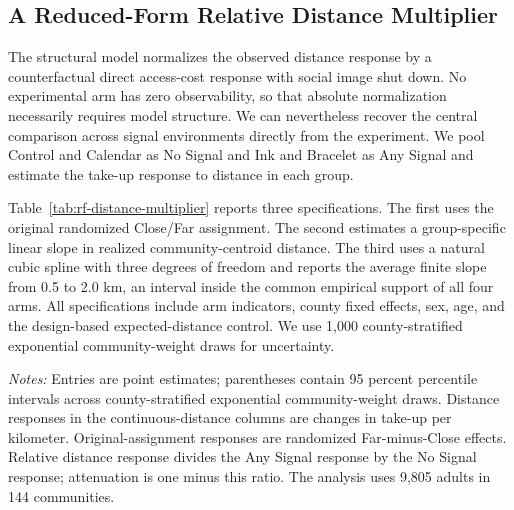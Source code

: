 \documentclass[12pt]{article}
\begin{document}
\providecommand{\StructuralRobustnessPath}{appendix/structural-robustness}

\subsection{A Reduced-Form Relative Distance Multiplier}
\label{app:reduced-form-distance-multiplier}

The structural model normalizes the observed distance response by a
counterfactual direct access-cost response with social image shut down. No
experimental arm has zero observability, so that absolute normalization
necessarily requires model structure. We can nevertheless recover the central
comparison across signal environments directly from the experiment. We pool
Control and Calendar as No Signal and Ink and Bracelet as Any Signal and
estimate the take-up response to distance in each group.

Table~\ref{tab:rf-distance-multiplier} reports three specifications. The first
uses the original randomized Close/Far assignment. The second estimates a
group-specific linear slope in realized community-centroid distance. The third
uses a natural cubic spline with three degrees of freedom and reports the average finite slope from
0.5 to 2.0 km, an interval inside the common empirical support of all four
arms. All specifications include arm indicators, county fixed effects, sex,
age, and the design-based expected-distance control. We use 1,000
county-stratified exponential community-weight draws for uncertainty.

\begin{table}[htbp]
  \centering
  \small
  \caption{Reduced-form distance responses and relative attenuation}
  \label{tab:rf-distance-multiplier}
  \resizebox{0.98\linewidth}{!}{%
    }
  \begin{minipage}{0.96\linewidth}
    \vspace{0.4em}\footnotesize
      \textit{Notes:} Entries are point estimates; parentheses contain
      95 percent percentile intervals across county-stratified exponential
      community-weight draws. Distance responses in the continuous-distance
      columns are changes in take-up per kilometer. Original-assignment
      responses are randomized Far-minus-Close effects. Relative distance
      response divides the Any Signal response by the No Signal response;
      attenuation is one minus this ratio. The analysis uses 9,805 adults in
      144 communities.
  \end{minipage}
\end{table}
\end{document}
